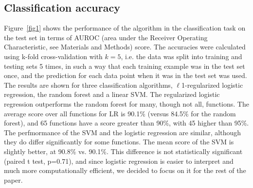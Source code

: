 \documentclass[10pt,letterpaper]{article}
\begin{document}
\subsection*{Classification accuracy}
Figure~\ref{fig1} shows the performance of the algorithm in the classification task on the test set in terms of AUROC (area under the Receiver Operating Characteristic, see Materials and Methods) score. The accuracies were calculated using k-fold cross-validation with $k=5$, i.e. the data was split into training and testing sets 5 times, in such a way that each training example was in the test set once, and the prediction for each data point when it was in the test set was used.  The results are shown for three classification algorithms, $\ell$1-regularized logistic regression, the random forest and a linear SVM. The regularized logistic regression outperforms the random forest for many, though not all, functions. The average score over all functions for LR is 90.1\% (versus 84.5\% for the random forest), and 65 functions have a score greater than 90\%, with 45 higher than 95\%. The perfmormance of the SVM and the logistic regression are similar, although they do differ significantly for some functions. The mean score of the SVM is slightly better, at 90.8\% vs. 90.1\%. This difference is not statistically significant (paired t test, p=0.71), and since logistic regression is easier to interpret and much more computationally efficient, we decided to focus on it for the rest of the paper.
\end{document}
